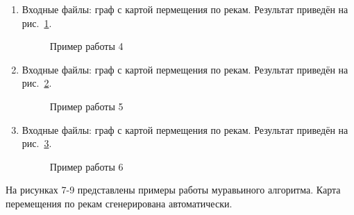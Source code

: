 \documentclass[12pt, a4paper]{article}
\begin{document}
\begin{enumerate}
	\item Входные файлы: граф с картой пермещения по 
	рекам.
	Результат приведён на рис.~\ref{img:grap4}.
	\begin{figure}[h]
  		\caption{Пример работы 4}
  		\label{img:grap4}
	\end{figure}
	\item Входные файлы: граф с картой пермещения по 
	рекам.
	Результат приведён на рис.~\ref{img:grap5}.
	\begin{figure}[h]
  		\caption{Пример работы 5}
  		\label{img:grap5}
	\end{figure}
	\item Входные файлы: граф с картой пермещения по 
	рекам.
	Результат приведён на рис.~\ref{img:grap6}.
	\begin{figure}[h]
  		\caption{Пример работы 6}
  		\label{img:grap6}
	\end{figure}
\end{enumerate}
\newpage
На рисунках 7-9 представлены примеры работы муравьиного алгоритма.
Карта перемещения по рекам сгенерирована автоматически.
\end{document}

